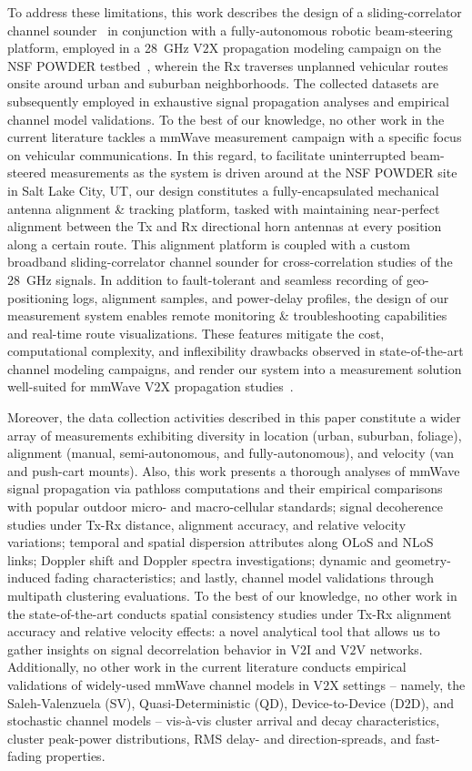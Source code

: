 \documentclass[12pt, draftcls, onecolumn]{IEEEtran}
\begin{document}
To address these limitations, this work describes the design of a sliding-correlator channel sounder~\cite{Sounder} in conjunction with a fully-autonomous robotic beam-steering platform, employed in a \SI{28}{\giga\hertz} V$2$X propagation modeling campaign on the NSF POWDER testbed~\cite{POWDER, POWDER_RF}, wherein the Rx traverses unplanned vehicular routes onsite around urban and suburban neighborhoods. The collected datasets are subsequently employed in exhaustive signal propagation analyses and empirical channel model validations. To the best of our knowledge, no other work in the current literature tackles a mmWave measurement campaign with a specific focus on vehicular communications. In this regard, to facilitate uninterrupted beam-steered measurements as the system is driven around at the NSF POWDER site in Salt Lake City, UT, our design constitutes a fully-encapsulated mechanical antenna alignment \& tracking platform, tasked with maintaining near-perfect alignment between the Tx and Rx directional horn antennas at every position along a certain route. This alignment platform is coupled with a custom broadband sliding-correlator channel sounder for cross-correlation studies of the \SI{28}{\giga\hertz} signals. In addition to fault-tolerant and seamless recording of geo-positioning logs, alignment samples, and power-delay profiles, the design of our measurement system enables remote monitoring \& troubleshooting capabilities and real-time route visualizations. These features mitigate the cost, computational complexity, and inflexibility drawbacks observed in state-of-the-art channel modeling campaigns, and render our system into a measurement solution well-suited for mmWave V$2$X propagation studies~\cite{ICC}.

Moreover, the data collection activities described in this paper constitute a wider array of measurements exhibiting diversity in location (urban, suburban, foliage), alignment (manual, semi-autonomous, and fully-autonomous), and velocity (van and push-cart mounts). Also, this work presents a thorough analyses of mmWave signal propagation via pathloss computations and their empirical comparisons with popular outdoor micro- and macro-cellular standards; signal decoherence studies under Tx-Rx distance, alignment accuracy, and relative velocity variations; temporal and spatial dispersion attributes along OLoS and NLoS links; Doppler shift and Doppler spectra investigations; dynamic and geometry-induced fading characteristics; and lastly, channel model validations through multipath clustering evaluations. To the best of our knowledge, no other work in the state-of-the-art conducts spatial consistency studies under Tx-Rx alignment accuracy and relative velocity effects: a novel analytical tool that allows us to gather insights on signal decorrelation behavior in V$2$I and V$2$V networks. Additionally, no other work in the current literature conducts empirical validations of widely-used mmWave channel models in V$2$X settings -- namely, the Saleh-Valenzuela (SV), Quasi-Deterministic (QD), Device-to-Device (D$2$D), and stochastic channel models -- vis-\`{a}-vis cluster arrival and decay characteristics, cluster peak-power distributions, RMS delay- and direction-spreads, and fast-fading properties.
\end{document}
